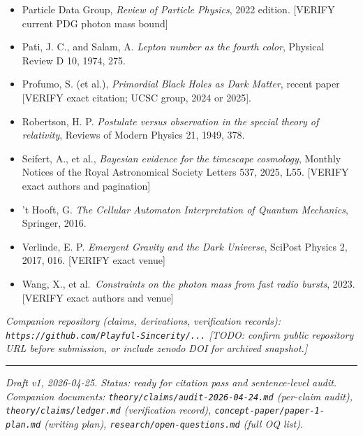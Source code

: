 \documentclass[12pt]{article}
\theoremstyle{definition}
\theoremstyle{remark}
\begin{document}
\begin{itemize}
  {[}VERIFY{]}
\item
  Particle Data Group, \emph{Review of Particle Physics}, 2022 edition.
  {[}VERIFY current PDG photon mass bound{]}
\item
  Pati, J. C., and Salam, A. \emph{Lepton number as the fourth color},
  Physical Review D 10, 1974, 275.
\item
  Profumo, S. (et al.), \emph{Primordial Black Holes as Dark Matter},
  recent paper {[}VERIFY exact citation; UCSC group, 2024 or 2025{]}.
\item
  Robertson, H. P. \emph{Postulate versus observation in the special
  theory of relativity}, Reviews of Modern Physics 21, 1949, 378.
\item
  Seifert, A., et al., \emph{Bayesian evidence for the timescape
  cosmology}, Monthly Notices of the Royal Astronomical Society Letters
  537, 2025, L55. {[}VERIFY exact authors and pagination{]}
\item
  't Hooft, G. \emph{The Cellular Automaton Interpretation of Quantum
  Mechanics}, Springer, 2016.
\item
  Verlinde, E. P. \emph{Emergent Gravity and the Dark Universe}, SciPost
  Physics 2, 2017, 016. {[}VERIFY exact venue{]}
\item
  Wang, X., et al.~\emph{Constraints on the photon mass from fast radio
  bursts}, 2023. {[}VERIFY exact authors and venue{]}
\end{itemize}

\emph{Companion repository (claims, derivations, verification records):
\texttt{https://github.com/Playful-Sincerity/...} {[}TODO: confirm
public repository URL before submission, or include zenodo DOI for
archived snapshot.{]}}

\begin{center}\rule{0.5\linewidth}{0.5pt}\end{center}

\emph{Draft v1, 2026-04-25. Status: ready for citation pass and
sentence-level audit. Companion documents:
\texttt{theory/claims/audit-2026-04-24.md} (per-claim audit),
\texttt{theory/claims/ledger.md} (verification record),
\texttt{concept-paper/paper-1-plan.md} (writing plan),
\texttt{research/open-questions.md} (full OQ list).}
\end{document}
